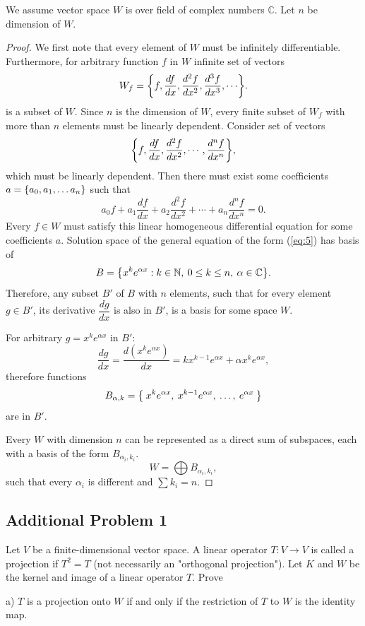 \documentclass{article}
\theoremstyle{definition}
\newcommand{\N}{\mathbb{N}}
\newcommand{\C}{\mathbb{C}}
\DeclarePairedDelimiter\set{\{}{\}}
\begin{document}
We assume vector space $W$ is over field of complex numbers $\C$.
Let $n$ be dimension of $W$.

\begin{proof}

We first note that every element of $W$ must be infinitely differentiable.
Furthermore, for arbitrary function $f$ in $W$ infinite set of vectors
\[ W_f = \set*{f, \frac{df}{dx}, \frac{d^2 f}{dx^2}, \frac{d^3 f}{dx^3}, \cdots }. \]
is a subset of $W$.
Since $n$ is the dimension of $W$, every finite subset of $W_f$ with more than $n$ elements must be linearly dependent.
Consider set of vectors
\[ \set*{ f, \frac{df}{dx}, \frac{d^2 f}{dx^2}, \cdots, \frac{d^n f}{dx^n} }, \]
which must be linearly dependent.
Then there must exist some coefficients $a = \set{a_0, a_1, \dots a_n}$ such that
\begin{equation} \label{eq:5}
a_0 f + a_1 \frac{df}{dx} + a_2 \frac{d^2 f}{dx^2} + \cdots + a_n \frac{d^n f}{dx^n} = 0.
\end{equation}
Every $f \in W$ must satisfy this linear homogeneous differential equation for some coefficients $a$.
Solution space of the general equation of the form (\ref{eq:5}) has basis of
\[ B = \set*{ x^k e^{\alpha x} : k \in \N, \> 0 \leq k \leq n, \> \alpha \in \C }. \]
Therefore, any subset $B'$ of $B$ with $n$ elements, such that for every element $g \in B'$, its derivative $\dfrac{dg}{dx}$ is also in $B'$, is a basis for some space $W$.

For arbitrary $g = x^k e^{\alpha x}$ in $B'$:
\[ \frac{dg}{dx} = \frac{d(x^k e^{\alpha x})}{dx} = k x^{k-1} e^{\alpha x} + \alpha x^k e^{\alpha x}, \]
therefore functions
\[
    B_{\alpha, k} = \set*{ \>
        x^k e^{\alpha x}, \>
        x^{k-1} e^{\alpha x}, \>
        \dots, \>
        e^{\alpha x} \>
    }
\]
are in $B'$.

Every $W$ with dimension $n$ can be represented as a direct sum of subspaces, each with a basis of the form $B_{\alpha_i, k_i}$.
\[ W = \bigoplus B_{\alpha_i,k_i}, \]
such that every $\alpha_i$ is different and  $\sum k_i = n$.

\end{proof}


\subsection*{Additional Problem 1}

\begin{tcolorbox}
Let $V$ be a finite-dimensional vector space. A linear operator $T: V \to V$ is called a projection if $T^2 = T$ (not necessarily an "orthogonal projection").
Let $K$ and $W$ be the kernel and image of a linear operator $T$.
Prove

a) $T$ is a projection onto $W$ if and only if the restriction of $T$ to $W$ is the identity map.
\end{tcolorbox}
\end{document}
